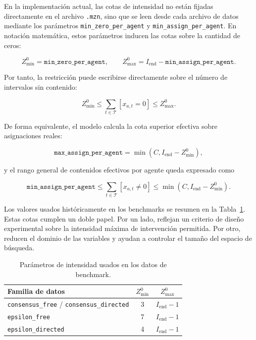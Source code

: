 \documentclass[10pt,letterpaper]{article}
\begin{document}
En la implementaci\'on actual, las cotas de intensidad no est\'an fijadas directamente en el archivo \texttt{.mzn}, sino que se leen desde cada archivo de datos mediante los par\'ametros \texttt{min\_zero\_per\_agent} y \texttt{min\_assign\_per\_agent}. En notaci\'on matem\'atica, estos par\'ametros inducen las cotas sobre la cantidad de ceros:

\[
Z^0_{\min}=\texttt{min\_zero\_per\_agent},
\qquad
Z^0_{\max}=I_{\text{end}}-\texttt{min\_assign\_per\_agent}.
\]

Por tanto, la restricci\'on puede escribirse directamente sobre el n\'umero de intervalos sin contenido:

\[
Z^0_{\min}
\leq
\sum_{t\in\mathcal{T}} [x_{a,t}=0]
\leq
Z^0_{\max}.
\]

De forma equivalente, el modelo calcula la cota superior efectiva sobre asignaciones reales:

\[
\texttt{max\_assign\_per\_agent}=\min(C,I_{\text{end}}-Z^0_{\min}),
\]

y el rango general de contenidos efectivos por agente queda expresado como

\[
\texttt{min\_assign\_per\_agent}
\leq
\sum_{t\in\mathcal{T}} [x_{a,t}\neq 0]
\leq
\min(C,I_{\text{end}}-Z^0_{\min}).
\]

Los valores usados hist\'oricamente en los benchmarks se resumen en la Tabla~\ref{tab:parametros-intensidad}. Estas cotas cumplen un doble papel. Por un lado, reflejan un criterio de dise\~no experimental sobre la intensidad m\'axima de intervenci\'on permitida. Por otro, reducen el dominio de las variables y ayudan a controlar el tama\~no del espacio de b\'usqueda.

\begin{table}[H]
\centering

\label{tab:parametros-intensidad}
\begin{tabular}{lcc}
\toprule
\textbf{Familia de datos} & \textbf{\(Z^0_{\min}\)} & \textbf{\(Z^0_{\max}\)} \\
\midrule
\texttt{consensus\_free} / \texttt{consensus\_directed} & 3 & \(I_{\text{end}}-1\) \\
\texttt{epsilon\_free} & 7 & \(I_{\text{end}}-1\) \\
\texttt{epsilon\_directed} & 4 & \(I_{\text{end}}-1\) \\
\bottomrule
\end{tabular}
\caption{Par\'ametros de intensidad usados en los datos de benchmark.}
\end{table}
\end{document}
